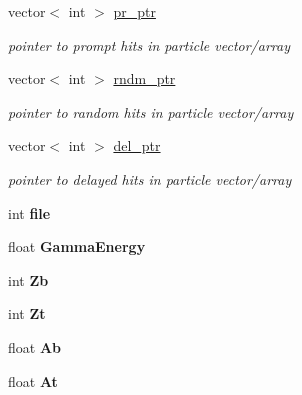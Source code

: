 \begin{DoxyCompactItemize}
\mbox{\label{classg__clx_a33325f12a127d94cc10a8cc491df2f15}} 
vector$<$ int $>$ \hyperlink{classg__clx_a33325f12a127d94cc10a8cc491df2f15}{pr\+\_\+ptr}
\begin{DoxyCompactList}\small\item\em pointer to prompt hits in particle vector/array \end{DoxyCompactList}\item 
\mbox{\label{classg__clx_a5dee420c080c876ed2c5467ec212d3f7}} 
vector$<$ int $>$ \hyperlink{classg__clx_a5dee420c080c876ed2c5467ec212d3f7}{rndm\+\_\+ptr}
\begin{DoxyCompactList}\small\item\em pointer to random hits in particle vector/array \end{DoxyCompactList}\item 
\mbox{\label{classg__clx_a8514273470549549d94417e7cade9b82}} 
vector$<$ int $>$ \hyperlink{classg__clx_a8514273470549549d94417e7cade9b82}{del\+\_\+ptr}
\begin{DoxyCompactList}\small\item\em pointer to delayed hits in particle vector/array \end{DoxyCompactList}\item 
\mbox{\label{classg__clx_a4b7f5bc375e032d31bebb6ba34cb328f}} 
int {\bfseries file}
\item 
\mbox{\label{classg__clx_aade220d336f2c91d09b4da5a14138436}} 
float {\bfseries Gamma\+Energy}
\item 
\mbox{\label{classg__clx_a10f3a51541a437abeafdde5e4d919296}} 
int {\bfseries Zb}
\item 
\mbox{\label{classg__clx_af3a63ef9a4e0e92e6646ec8c9e86cd2d}} 
int {\bfseries Zt}
\item 
\mbox{\label{classg__clx_a9806f6d9aa4ecd6daeccd1f8184bbb5e}} 
float {\bfseries Ab}
\item 
\mbox{\label{classg__clx_a0a85cb0adca7a54ed29ebda550b36dcc}} 
float {\bfseries At}
\item 
\mbox{\label{classg__clx_adacfaa00cabbde7095f23a1cacab7510}} 

\end{DoxyCompactItemize}
